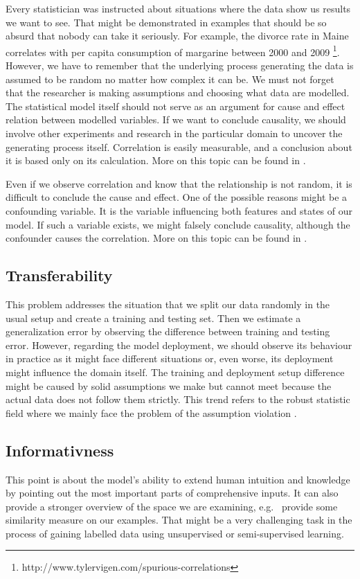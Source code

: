 Every statistician was instructed about situations where the data show us results we want to see. That might be demonstrated in examples that should be so absurd that nobody can take it seriously. For example, the divorce rate in Maine correlates with per capita consumption of margarine between 2000 and 2009 \footnote{http://www.tylervigen.com/spurious-correlations}. However, we have to remember that the underlying process generating the data is assumed to be random no matter how complex it can be. We must not forget that the researcher is making assumptions and choosing what data are modelled. The statistical model itself should not serve as an argument for cause and effect relation between modelled variables. If we want to conclude causality, we should involve other experiments and research in the particular domain to uncover the generating process itself. Correlation is easily measurable, and a conclusion about it is based only on its calculation. More on this topic can be found in \cite{Kenny1979}.

Even if we observe correlation and know that the relationship is not random, it is difficult to conclude the cause and effect. One of the possible reasons might be a confounding variable. It is the variable influencing both features and states of our model. If such a variable exists, we might falsely conclude causality, although the confounder causes the correlation. More on this topic can be found in \cite{Skelly2012}.

\subsection{Transferability}
This problem addresses the situation that we split our data randomly in the usual setup and create a training and testing set. Then we estimate a generalization error by observing the difference between training and testing error. However, regarding the model deployment, we should observe its behaviour in practice as it might face different situations or, even worse, its deployment might influence the domain itself. The training and deployment setup difference might be caused by solid assumptions we make but cannot meet because the actual data does not follow them strictly. This trend refers to the robust statistic field where we mainly face the problem of the assumption violation \cite{Erceg-Hurn2008}.

\subsection{Informativness}
This point is about the model's ability to extend human intuition and knowledge by pointing out the most important parts of comprehensive inputs. It can also provide a stronger overview of the space we are examining, e.g. \ provide some similarity measure on our examples. That might be a very challenging task in the process of gaining labelled data using unsupervised or semi-supervised learning.

